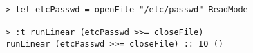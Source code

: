 \begin{repl}\begin{lstlisting}
> let etcPasswd = openFile "/etc/passwd" ReadMode

> :t runLinear (etcPasswd >>= closeFile)
runLinear (etcPasswd >>= closeFile) :: IO ()\end{lstlisting}\end{repl}
